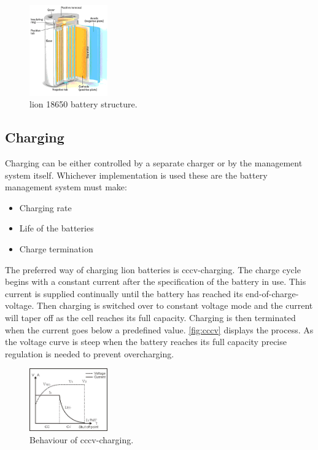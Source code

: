 \begin{figure}[H]
	\centering
	\includegraphics[width=0.3\textwidth]{Figures/cellstruct.png}
	\caption{\gls{lion} 18650 battery structure.}
	\label{fig:cellstruct}
\end{figure}

\subsection{Charging}
Charging can be either controlled by a separate charger or by the management system itself. Whichever implementation is used these are the battery management system must make\cite{book111}:

\begin{itemize}[noitemsep]
	\item Charging rate
	\item Life of the batteries
	\item Charge termination
\end{itemize}

The preferred way of charging \gls{lion} batteries is \gls{cccv}-charging. The charge cycle begins with a constant current after the specification of the battery in use. This current is supplied continually until the battery has reached its end-of-charge-voltage. Then charging is switched over to constant voltage mode and the current will taper off as the cell reaches its full capacity. Charging is then terminated when the current goes below a predefined value. \autoref{fig:cccv} displays the process. As the voltage curve is steep when the battery reaches its full capacity precise regulation is needed to prevent overcharging\cite{cccv}\cite{book112}.

\begin{figure}[H]
	\centering
	\includegraphics[width=0.3\textwidth]{Figures/cccv.jpg}
	\caption{Behaviour of \gls{cccv}-charging.}
	\label{fig:cccv}
\end{figure}

